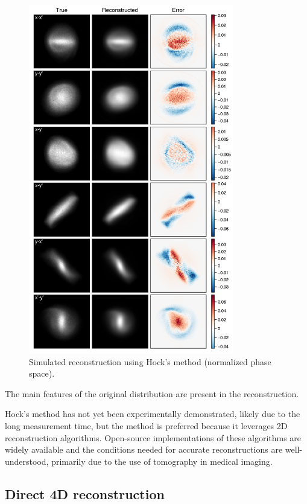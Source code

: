 \begin{figure}[!p]
    \centering
    \includegraphics[width=0.8\textwidth]{Images/chapter4/tomo_sim_rec_hock_proj_2D.png}
    \caption{Simulated reconstruction using Hock's method (normalized phase space).}
    \label{fig:tomo_sim_rec_hock_proj_2D}
\end{figure}
%
The main features of the original distribution are present in the reconstruction.

Hock's method has not yet been experimentally demonstrated, likely due to the long measurement time, but the method is preferred because it leverages 2D reconstruction algorithms. Open-source implementations of these algorithms are widely available and the conditions needed for accurate reconstructions are well-understood, primarily due to the use of tomography in medical imaging. 


\subsection{Direct 4D reconstruction}

